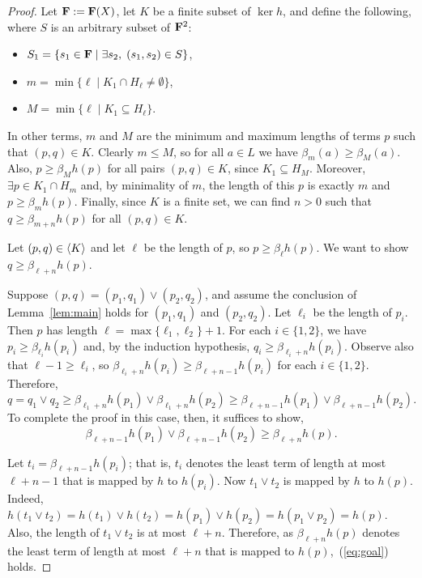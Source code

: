 \begin{proof}
Let $\mathbf{F} := \mathbf{F}(X)$, let $K$ be a finite subset of $\ker h$, and
define the following, where $S$ is an arbitrary subset of $\mathbf{F}^2$:
 \begin{itemize}
\item $S_1 = \{s_1 \in \mathbf{F} \mid \exists s_2, \; (s_1,s_2) \in S \}$,
\item $m = \min \{\ell \mid K_1 \cap H_\ell \neq \emptyset\}$,
\item $M = \min \{\ell \mid K_1 \subseteq H_\ell\}$.
\end{itemize}
In other terms, $m$ and $M$ are the minimum and maximum lengths of 
terms $p$ such that $(p,q) \in K$.
Clearly $m\leq M$, so for all $a\in L$ we have $\beta_m(a) \geq \beta_M(a)$. 
Also, $p\geq \beta_M h(p)$ for all pairs $(p, q)\in K$, since $K_1 \subseteq H_M$.
Moreover, $\exists p \in K_1 \cap H_m$ and, by minimality of $m$, the length of 
this $p$ is exactly $m$ and $p \geq \beta_{m} h(p)$.
Finally, since $K$ is a finite set, we can find $n>0$ such that 
$q \geq \beta_{m+n} h(p)$ for all $(p, q) \in K$.

Let $(p,q) \in \langle K\rangle$ and let $\ell$ be the length of $p$, so 
$p\geq \beta_{\ell}h(p)$.  We want to show $q \geq \beta_{\ell + n}h(p)$.

 Suppose $(p, q) = (p_1, q_1) \vee (p_2, q_2)$,
and assume the conclusion of Lemma~\ref{lem:main} holds for 
$(p_1, q_1)$ and $(p_2, q_2)$.
Let $\ell_i$ be the length of $p_i$.  Then $p$ has length 
$\ell = \max\{\ell_1, \ell_2\} + 1$. For each $i\in \{1,2\}$,
we have $p_i\geq \beta_{\ell_i}h(p_i)$ and, by the induction hypothesis,
$q_i\geq \beta_{\ell_i+n}h(p_i)$.  Observe also that 
$\ell -1 \geq \ell_i$, so 
$\beta_{\ell_i+n}h(p_i) \geq \beta_{\ell+n-1}h(p_i)$ for each $i\in \{1,2\}$.
Therefore, 
\[
q = q_1\vee q_2\geq \beta_{\ell_1+n}h(p_1) \vee \beta_{\ell_1+n}h(p_2)
\geq \beta_{\ell+n-1}h(p_1) \vee \beta_{\ell+n-1}h(p_2).
\]
To complete the proof in this case, then, it suffices to show,
\begin{equation}
\label{eq:goal}  
\beta_{\ell+n-1}h(p_1) \vee \beta_{\ell+n-1}h(p_2) \geq 
\beta_{\ell+n}h(p).
\end{equation}

Let $t_i = \beta_{\ell+n-1}h(p_i)$; that is, $t_i$ denotes the
least term of length at most 
$\ell + n -1$ that is mapped by $h$ to $h(p_i)$.
Now $t_1 \vee t_2$ is mapped by $h$ to $h(p)$. Indeed,
$h(t_1\vee t_2) = h(t_1)\vee h(t_2) = h(p_1)\vee h(p_2) = h(p_1\vee p_2) = 
h(p)$. Also, the length of $t_1 \vee t_2$ is at most $\ell +n$.
Therefore, as $\beta_{\ell+n}h(p)$ denotes the least term of length at most
$\ell +n$ that is mapped to $h(p)$,~(\ref{eq:goal}) holds.


\end{proof}
